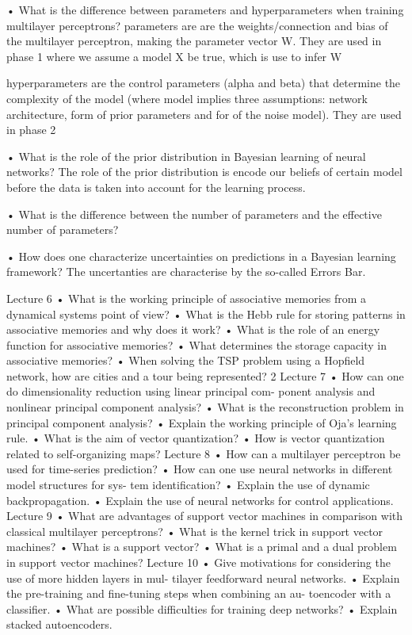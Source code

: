 • What is the difference between parameters and hyperparameters when
training multilayer perceptrons?
parameters are are the weights/connection and bias of the multilayer perceptron, making the parameter vector W. They are used in phase 1 where we assume a model X be true, which is use to infer W

hyperparameters are the control parameters (alpha and beta) that determine the complexity of the model (where model implies three assumptions: network architecture, form of prior parameters and for of the noise model). They are used in phase 2

• What is the role of the prior distribution in Bayesian learning of neural networks?
The role of the prior distribution is encode our beliefs of certain model before the data is taken into account for the learning process.

• What is the difference between the number of parameters and the effective number of parameters?


• How does one characterize uncertainties on predictions in a Bayesian learning framework?
The uncertanties are characterise by the so-called Errors Bar.



Lecture 6
• What is the working principle of associative memories from a dynamical systems point of view?
• What is the Hebb rule for storing patterns in associative memories and why does it work?
• What is the role of an energy function for associative memories?
• What determines the storage capacity in associative memories?
• When solving the TSP problem using a Hopfield network, how are cities and a tour being represented?
2
Lecture 7
• How can one do dimensionality reduction using linear principal com- ponent analysis and nonlinear principal component analysis?
• What is the reconstruction problem in principal component analysis?
• Explain the working principle of Oja’s learning rule.
• What is the aim of vector quantization?
• How is vector quantization related to self-organizing maps?
Lecture 8
• How can a multilayer perceptron be used for time-series prediction?
• How can one use neural networks in different model structures for sys-
tem identification?
• Explain the use of dynamic backpropagation.
• Explain the use of neural networks for control applications.
Lecture 9
• What are advantages of support vector machines in comparison with classical multilayer perceptrons?
• What is the kernel trick in support vector machines?
• What is a support vector?
• What is a primal and a dual problem in support vector machines?
Lecture 10
• Give motivations for considering the use of more hidden layers in mul- tilayer feedforward neural networks.
• Explain the pre-training and fine-tuning steps when combining an au- toencoder with a classifier.
• What are possible difficulties for training deep networks?
• Explain stacked autoencoders.
